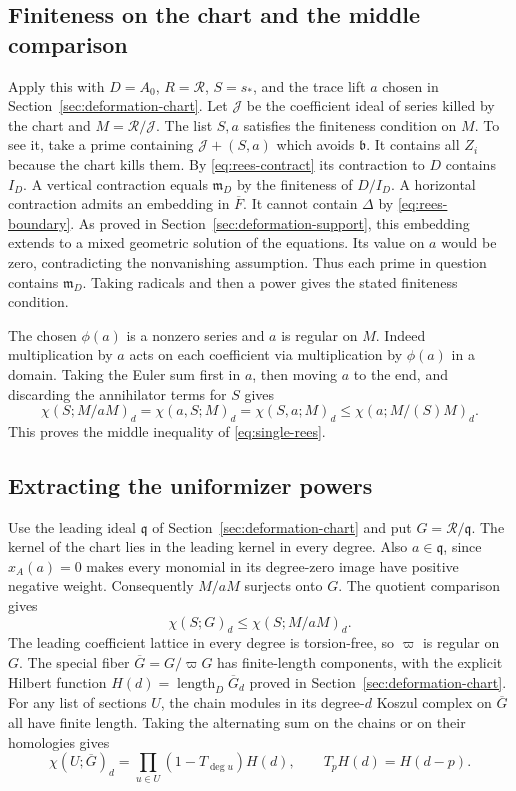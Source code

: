 \subsection{Finiteness on the chart and the middle comparison}

Apply this with \(D=A_0\), \(R=\mathcal R\), \(S=s_*\), and the
trace lift \(a\) chosen in Section~\ref{sec:deformation-chart}.
Let \(\mathcal J\) be the coefficient ideal of series killed by
the chart and \(M=\mathcal R/\mathcal J\). The list \(S,a\)
satisfies the finiteness condition on \(M\). To see it, take a
prime containing \(\mathcal J+(S,a)\) which avoids \(\mathfrak b\).
It contains all \(Z_i\) because the chart kills them. By
\eqref{eq:rees-contract} its contraction to \(D\) contains \(I_D\).
A vertical contraction equals \(\mathfrak m_D\) by the finiteness
of \(D/I_D\). A horizontal contraction admits an embedding in
\(\overline F\). It cannot contain \(\Delta\) by
\eqref{eq:rees-boundary}. As proved in Section~\ref{sec:deformation-support},
this embedding extends to a mixed geometric solution of the
equations. Its value on \(a\) would be zero, contradicting the
nonvanishing assumption. Thus each prime in question contains
\(\mathfrak m_D\). Taking radicals and then a power gives the stated
finiteness condition.

The chosen \(\phi(a)\) is a nonzero series and \(a\) is regular on
\(M\). Indeed multiplication by \(a\) acts on each coefficient via
multiplication by \(\phi(a)\) in a domain. Taking the Euler sum first
in \(a\), then moving \(a\) to the end, and discarding the
annihilator terms for \(S\) gives
\[
 \chi(S;M/aM)_d=\chi(a,S;M)_d=\chi(S,a;M)_d
              \le\chi(a;M/(S)M)_d .
\]
This proves the middle inequality of \eqref{eq:single-rees}.

\subsection{Extracting the uniformizer powers}

Use the leading ideal \(\mathfrak q\) of
Section~\ref{sec:deformation-chart} and put \(G=\mathcal R/\mathfrak q\).
The kernel of the chart lies in the leading kernel in every degree.
Also \(a\in\mathfrak q\), since \(x_A(a)=0\) makes every monomial
in its degree-zero image have positive negative weight. Consequently
\(M/aM\) surjects onto \(G\). The quotient comparison gives
\[
                         \chi(S;G)_d\le\chi(S;M/aM)_d .
\]
The leading coefficient lattice in every degree is torsion-free,
so \(\varpi\) is regular on \(G\). The special fiber
\(\overline G=G/\varpi G\) has finite-length components, with the
explicit Hilbert function \(H(d)=\operatorname{length}_D\overline G_d\)
proved in Section~\ref{sec:deformation-chart}. For any list of
sections \(U\), the chain modules in its degree-\(d\) Koszul complex
on \(\overline G\) all have finite length. Taking the alternating
sum on the chains or on their homologies gives
\[
        \chi(U;\overline G)_d=
              \prod_{u\in U}(1-T_{\deg u})H(d),
       \qquad T_p H(d)=H(d-p).
\]

